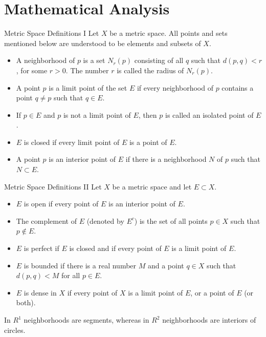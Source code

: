 \section{Mathematical Analysis}

\begin{frame}{Metric Space Definitions I}
    \small
    Let $X$ be a metric space. All points and sets mentioned below are understood to be elements and subsets of $X$.
    \begin{itemize}
        \setlength{\itemsep}{0.4em}
        \item A neighborhood of $p$ is a set $N_r(p)$ consisting of all $q$ such that $d(p,q) < r$, for some $r > 0$. The number $r$ is called the radius of $N_r(p)$.
        \item A point $p$ is a limit point of the set $E$ if every neighborhood of $p$ contains a point $q \ne p$ such that $q \in E$.
        \item If $p \in E$ and $p$ is not a limit point of $E$, then $p$ is called an isolated point of $E$.
        \item $E$ is closed if every limit point of $E$ is a point of $E$.
        \item A point $p$ is an interior point of $E$ if there is a neighborhood $N$ of $p$ such that $N \subset E$.
    \end{itemize}
\end{frame}

\begin{frame}{Metric Space Definitions II}
    \small
    Let $X$ be a metric space and let $E \subset X$.
    \begin{itemize}
        \setlength{\itemsep}{0.45em}
        \item $E$ is open if every point of $E$ is an interior point of $E$.
        \item The complement of $E$ (denoted by $E^c$) is the set of all points $p \in X$ such that $p \notin E$.
        \item $E$ is perfect if $E$ is closed and if every point of $E$ is a limit point of $E$.
        \item $E$ is bounded if there is a real number $M$ and a point $q \in X$ such that $d(p,q) < M$ for all $p \in E$.
        \item $E$ is dense in $X$ if every point of $X$ is a limit point of $E$, or a point of $E$ (or both).
    \end{itemize}

    \vspace{0.6em}
    In $R^1$ neighborhoods are segments, whereas in $R^2$ neighborhoods are interiors of circles.
\end{frame}
